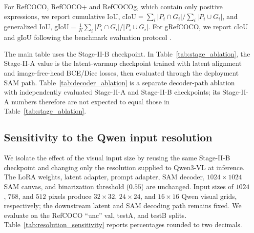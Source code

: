 For RefCOCO, RefCOCO+ and RefCOCOg, which contain only positive expressions, we report cumulative IoU, $\mathrm{cIoU}=\sum_i |P_i\cap G_i| / \sum_i |P_i\cup G_i|$, and generalized IoU, $\mathrm{gIoU}=\frac{1}{N}\sum_i |P_i\cap G_i|/|P_i\cup G_i|$. For gRefCOCO, we report cIoU and gIoU following the benchmark evaluation protocol \cite{Liu2023GRES}.

The main table uses the Stage-II-B checkpoint. In Table~\ref{tab:stage_ablation}, the Stage-II-A value is the latent-warmup checkpoint trained with latent alignment and image-free-head BCE/Dice losses, then evaluated through the deployment SAM path. Table~\ref{tab:decoder_ablation} is a separate decoder-path ablation with independently evaluated Stage-II-A and Stage-II-B checkpoints; its Stage-II-A numbers therefore are not expected to equal those in Table~\ref{tab:stage_ablation}.

\subsection{Sensitivity to the Qwen input resolution}
\label{sec:app_resolution}

We isolate the effect of the visual input size by reusing the same Stage-II-B checkpoint and changing only the resolution supplied to Qwen3-VL at inference. The LoRA weights, latent adapter, prompt adapter, SAM decoder, $1024\times1024$ SAM canvas, and binarization threshold ($0.55$) are unchanged. Input sizes of $1024$, $768$, and $512$ pixels produce $32\times32$, $24\times24$, and $16\times16$ Qwen visual grids, respectively; the downstream latent and SAM decoding path remains fixed. We evaluate on the RefCOCO ``unc'' val, testA, and testB splits. Table~\ref{tab:resolution_sensitivity} reports percentages rounded to two decimals.

\begin{table}[!t]
  \centering
  \scriptsize
  \setlength{\tabcolsep}{2.5pt}
  \renewcommand{\arraystretch}{0.98}
  \caption{Sensitivity to Qwen input resolution on RefCOCO. The checkpoint and all model parameters are fixed; only the Qwen image size changes. Values are gIoU and cIoU (\%).}
  \label{tab:resolution_sensitivity}
\end{table}

